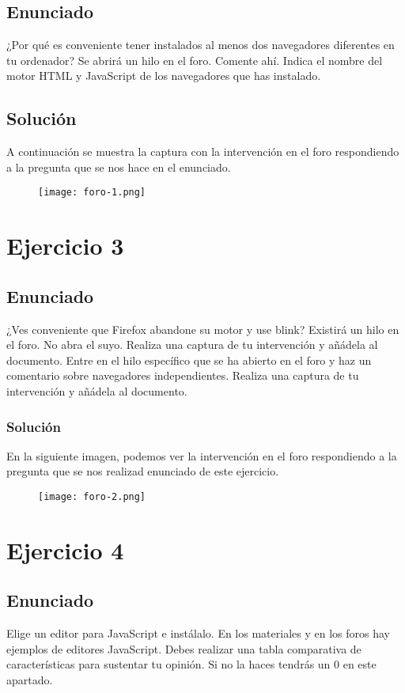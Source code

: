 \subsection{Enunciado}
¿Por qué es conveniente tener instalados al menos dos navegadores diferentes en tu ordenador? Se abrirá un hilo en el foro. Comente ahí.   Indica el nombre del motor HTML y JavaScript de los navegadores que has instalado.

\subsection{Solución}
A continuación se muestra la captura con la intervención en el foro respondiendo a la pregunta que se nos hace en el enunciado.

\begin{figure}[H]
    \centering
    \texttt{[image: foro-1.png]}
\end{figure}

\section{Ejercicio 3}
\subsection{Enunciado}
¿Ves conveniente que  Firefox abandone su motor y use blink?  Existirá un hilo en el foro. No abra el suyo. Realiza una captura de tu intervención y añádela al documento.  Entre en el hilo específico que se ha abierto en el foro  y haz un comentario sobre navegadores independientes. Realiza una captura de tu intervención y añádela al documento.

\subsubsection{Solución}
En la siguiente imagen, podemos ver la intervención en el foro respondiendo a la pregunta que se nos realizad enunciado de este ejercicio.

\begin{figure}[H]
    \centering
    \texttt{[image: foro-2.png]}
\end{figure}

\section{Ejercicio 4}
\subsection{Enunciado}
Elige un editor para JavaScript e instálalo.  En los materiales y en los foros hay ejemplos de  editores JavaScript. Debes realizar una tabla comparativa de características para sustentar tu opinión. Si no la haces tendrás un 0 en este apartado.


